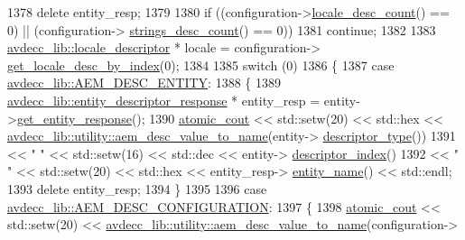 \begin{DoxyCode}
1378         \textcolor{keyword}{delete} entity\_resp;
1379 
1380         \textcolor{keywordflow}{if} ((configuration->\hyperlink{classavdecc__lib_1_1configuration__descriptor_ab677ec4987bcd55bfcfa0e524b6f78f6}{locale\_desc\_count}() == 0) || (configuration->
      \hyperlink{classavdecc__lib_1_1configuration__descriptor_a15e2737b1998af8123e888697dc62859}{strings\_desc\_count}() == 0))
1381             \textcolor{keywordflow}{continue};
1382 
1383         \hyperlink{classavdecc__lib_1_1locale__descriptor}{avdecc\_lib::locale\_descriptor} * locale = configuration->
      \hyperlink{classavdecc__lib_1_1configuration__descriptor_a7d32e35d54b0dfaa2e99318315029269}{get\_locale\_desc\_by\_index}(0);
1384 
1385         \textcolor{keywordflow}{switch} (0)
1386         \{
1387         \textcolor{keywordflow}{case} \hyperlink{namespaceavdecc__lib_ac7b7d227e46bc72b63ee9e9aae15902fac9ebb31a55e5894637f6c3c710ceceaf}{avdecc\_lib::AEM\_DESC\_ENTITY}:
1388         \{
1389             \hyperlink{classavdecc__lib_1_1entity__descriptor__response}{avdecc\_lib::entity\_descriptor\_response} * entity\_resp = 
      entity->\hyperlink{classavdecc__lib_1_1entity__descriptor_ac31dd117f0c931ae93c8ba52df7211bd}{get\_entity\_response}();
1390             \hyperlink{cmd__line_8h_a0bc38ccc65c79ba06c6fcd7b4bf554c3}{atomic\_cout} << std::setw(20) << std::hex << 
      \hyperlink{namespaceavdecc__lib_1_1utility_a6bdd02679e5a911a071d4aa03be341f0}{avdecc\_lib::utility::aem\_desc\_value\_to\_name}(entity->
      \hyperlink{classavdecc__lib_1_1descriptor__base_a5112b70022171063ec5d3242bee9910e}{descriptor\_type}())
1391                         << \textcolor{stringliteral}{"   "} << std::setw(16) << std::dec << entity->
      \hyperlink{classavdecc__lib_1_1descriptor__base_a7eed5583bffdf72d89021b188648c1b5}{descriptor\_index}()
1392                         << \textcolor{stringliteral}{"   "} << std::setw(20) << std::hex << entity\_resp->
      \hyperlink{classavdecc__lib_1_1entity__descriptor__response_a3abd11ceacbf37b685377f2b73a502ca}{entity\_name}() << std::endl;
1393             \textcolor{keyword}{delete} entity\_resp;
1394         \}
1395 
1396         \textcolor{keywordflow}{case} \hyperlink{namespaceavdecc__lib_ac7b7d227e46bc72b63ee9e9aae15902fab391827cda146b0d4199adf80f47117a}{avdecc\_lib::AEM\_DESC\_CONFIGURATION}:
1397         \{
1398             \hyperlink{cmd__line_8h_a0bc38ccc65c79ba06c6fcd7b4bf554c3}{atomic\_cout} << std::setw(20) << 
      \hyperlink{namespaceavdecc__lib_1_1utility_a6bdd02679e5a911a071d4aa03be341f0}{avdecc\_lib::utility::aem\_desc\_value\_to\_name}(configuration->

\end{DoxyCode}
